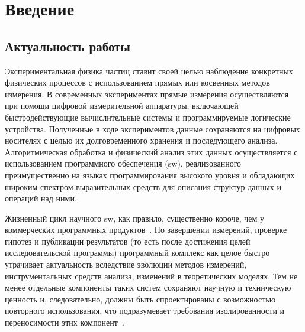 \chapter*{\centering Введение}

\section*{Актуальность работы}

Экспериментальная физика частиц ставит своей целью наблюдение конкретных
физических процессов с использованием прямых или косвенных методов
измерения. В современных экспериментах прямые измерения осуществляются
при помощи цифровой измерительной аппаратуры, включающей быстродействующие
вычислительные системы и программируемые логические устройства.
Полученные в ходе экспериментов данные сохраняются на цифровых носителях
с целью их долговременного хранения и последующего анализа. Алгоритмическая
обработка и физический анализ этих данных осуществляется с использованием
программного обеспечения (\acrshort{sw}), реализованного преимущественно на
языках программирования высокого уровня и обладающих широким спектром
выразительных средств для описания структур данных и операций над ними.

Жизненный цикл научного \acrshort{sw}, как
правило, существенно короче, чем у коммерческих программных
продуктов~\cite{lifecycle-lenhardt2014data}.
По завершении измерений, проверке гипотез и публикации
результатов (то есть после достижения целей исследовательской
программы) программный комплекс как целое быстро утрачивает актуальность
вследствие эволюции методов измерений, инструментальных средств анализа,
изменений в теоретических моделях.
Тем не менее отдельные компоненты таких систем сохраняют
научную и техническую ценность и, следовательно, должны быть
спроектированы с возможностью повторного использования, что
подразумевает требования изолированности и переносимости этих
компонент~\cite{sci-software-eng-arvanitou2021, software-for-science-CarverEtAl2016, Kaida2023-architecture}.

